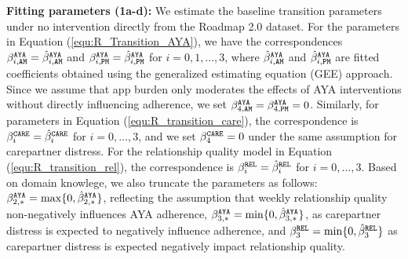 \textbf{Fitting parameters (1a-d):} We estimate the baseline transition parameters under no intervention directly from the Roadmap 2.0 dataset. For the parameters in Equation (\ref{equ:R_Transition_AYA}), we have the correspondences 
$\beta_{i, {\texttt{AM}}}^{\tiny\texttt{AYA}} = \hat{\beta}_{i, {\texttt{AM}}}^{\tiny\texttt{AYA}}$ and $\beta_{i, {\texttt{PM}}}^{\tiny\texttt{AYA}} = \hat{\beta}_{i, {\texttt{PM}}}^{\tiny\texttt{AYA}}$ for $i = 0, 1, \dots, 3$, where $\hat{\beta}_{i, {\texttt{AM}}}^{\tiny\texttt{AYA}}$ and $\hat{\beta}_{i, {\texttt{PM}}}^{\tiny\texttt{AYA}}$ are fitted coefficients obtained using the generalized estimating equation (GEE) approach. Since we assume that app burden only moderates the effects of AYA interventions without directly influencing adherence, we set $\beta_{4, {\texttt{AM}}}^{\tiny\texttt{AYA}} = \beta_{4, {\texttt{PM}}}^{\tiny\texttt{AYA}} = 0$. Similarly, for parameters in Equation (\ref{equ:R_transition_care}), the correspondence is $\beta_{i}^{\tiny\texttt{CARE}} = \hat{\beta}_{i}^{\tiny\texttt{CARE}}$ for $i = 0, \dots, 3$, and we set $\beta_{4}^{\tiny\texttt{CARE}} = 0$ under the same assumption for carepartner distress. For the relationship quality model in Equation (\ref{equ:R_transition_rel}), the correspondence is $\beta_{i}^{\tiny\texttt{REL}} = \hat{\beta}_{i}^{\tiny\texttt{REL}}$ for $i = 0, \dots, 3$. Based on domain knowlege, we also truncate the parameters as follows: $\beta_{2, *}^{\tiny\texttt{AYA}} = \max\{0, \hat{\beta}_{2, *}^{\tiny\texttt{AYA}}\}$, reflecting the assumption that weekly relationship quality non-negatively influences AYA adherence, $\beta_{3, *}^{\tiny\texttt{AYA}} = \min\{0, \hat{\beta}_{3, *}^{\tiny\texttt{AYA}}\}$, as carepartner distress is expected to negatively influence adherence, and $\beta_{3}^{\tiny\texttt{REL}} = \min\{0, \hat{\beta}_{3}^{\tiny\texttt{REL}}\}$ as carepartner distress is expected negatively impact relationship quality.



